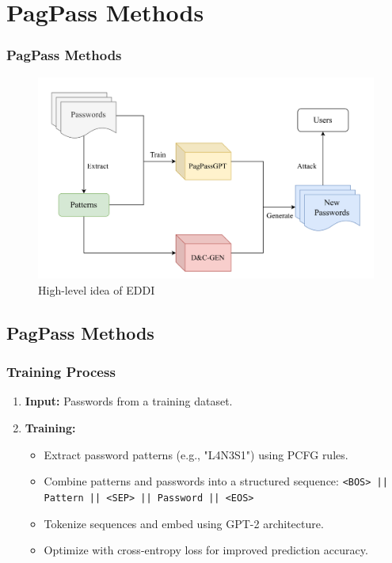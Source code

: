 \documentclass[
	12pt, %
]{beamer}
\begin{document}
\section{PagPass Methods}
\begin{frame}
	\frametitle{PagPass Methods}
	
	\begin{figure}
		\includegraphics[width=0.9\linewidth]{img1.png}
		\caption{High-level idea of EDDI}
		\label{High-level idea of EDDI}
	\end{figure}
\end{frame}





\subsection{PagPass Methods}
\begin{frame}
	\frametitle{Training Process}
	\begin{enumerate}
		\item \textbf{Input:} Passwords from a training dataset.
		\item \textbf{Training:}
		\begin{itemize}
			\item Extract password patterns (e.g., "L4N3S1") using PCFG rules.
			\item Combine patterns and passwords into a structured sequence:
			\texttt{<BOS> || Pattern || <SEP> || Password || <EOS>}
			\item Tokenize sequences and embed using GPT-2 architecture.
			\item Optimize with cross-entropy loss for improved prediction accuracy.
		\end{itemize}
	\end{enumerate}
\end{frame}
\end{document}
